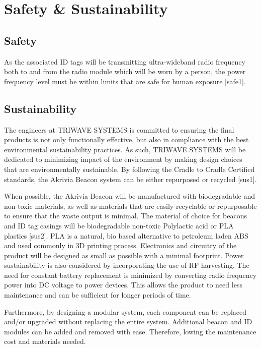 %

\setcounter{section}{4}
\section{Safety \& Sustainability}
\bigskip
\subsection{Safety}
\medskip
As the associated ID tags will be transmitting ultra-wideband radio frequency both to and from the radio module which will be worn by a person, the power frequency level must be within limits that are safe for human exposure [safe1].


\break
\subsection{Sustainability}
\bigskip
The engineers at TRIWAVE SYSTEMS is committed to ensuring the final products is not only functionally effective, but also in compliance with the best environmental sustainability practices. As such, TRIWAVE SYSTEMS will be dedicated to minimizing impact of the environment by making design choices that are environmentally sustainable. By following the Cradle to Cradle Certified standards, the Akrivia Beacon system can be either repurposed or recycled [sus1].

\bigskip
When possible, the Akrivia Beacon will be manufactured with biodegradable and non-toxic materials, as well as materials that are easily recyclable or repurposable to ensure that the waste output is minimal. The material of choice for beacons and ID tag casings will be biodegradable non-toxic Polylactic acid or PLA plastics [sus2]. PLA is a natural, bio based alternative to petroleum laden ABS and used commonly in 3D printing process. Electronics and circuitry of the product will be designed as small as possible with a minimal footprint. Power sustainability is also considered by incorporating the use of RF harvesting. The need for constant battery replacement is minimized by converting radio frequency power into DC voltage to power devices. This allows the product to need less maintenance and can be sufficient for longer periods of time. 

\bigskip
Furthermore, by designing a modular system, each component can be replaced and/or upgraded without replacing the entire system. Additional beacon and ID modules can be added and removed with ease. Therefore, lowing the maintenance cost and materials needed.



	
%